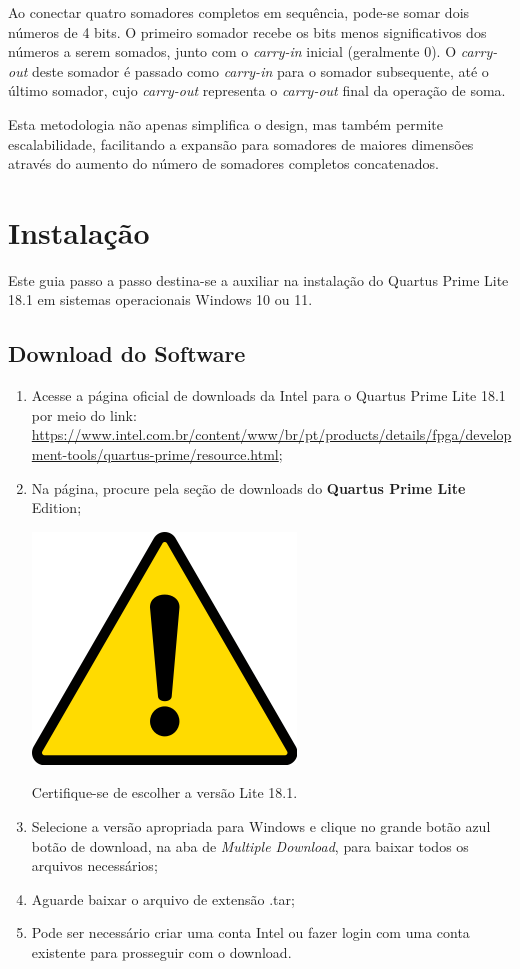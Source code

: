 \documentclass[12pt,a4paper]{article}
\newcommand{\DonwloadUrl}{\url{https://www.intel.com.br/content/www/br/pt/products/details/fpga/development-tools/quartus-prime/resource.html}}
\newcommand{\Version}{18.1}
\newcommand{\Attention}[1]{
    \begin{tcolorbox}[colback=red!5!white, colframe=red!75!black]
        \noindent
        \begin{minipage}[c]{1cm}%
            \includegraphics[width=\linewidth]{figs/attention.png}
        \end{minipage}%
        \hfill%
        \begin{minipage}[c]{\dimexpr\linewidth-1cm-2mm}%
            \begin{center}
                #1    
            \end{center}            
        \end{minipage}
    \end{tcolorbox}
}
\begin{document}
Ao conectar quatro somadores completos em sequência, pode-se somar dois números de 4 bits. O primeiro somador recebe os bits menos significativos dos números a serem somados, junto com o \textit{carry-in} inicial (geralmente 0). O \textit{carry-out} deste somador é passado como \textit{carry-in} para o somador subsequente, até o último somador, cujo \textit{carry-out} representa o \textit{carry-out} final da operação de soma.

Esta metodologia não apenas simplifica o design, mas também permite escalabilidade, facilitando a expansão para somadores de maiores dimensões através do aumento do número de somadores completos concatenados. %

\section{Instalação}

Este guia passo a passo destina-se a auxiliar na instalação do Quartus Prime Lite \Version{} em sistemas operacionais Windows 10 ou 11.

\subsection{Download do Software}

\begin{enumerate}
    \item Acesse a página oficial de downloads da Intel para o Quartus Prime Lite \Version{} por meio do link: \DonwloadUrl;
    \item Na página, procure pela seção de downloads do \textbf{Quartus Prime Lite} Edition;
    
    \Attention{Certifique-se de escolher a versão Lite \Version.}

    \item Selecione a versão apropriada para Windows e clique no grande botão azul botão de download, na aba de \textit{Multiple Download}, para baixar todos os arquivos necessários;
    \item Aguarde baixar o arquivo de extensão .tar;
    \item Pode ser necessário criar uma conta Intel ou fazer login com uma conta existente para prosseguir com o download.
\end{enumerate}
\end{document}
